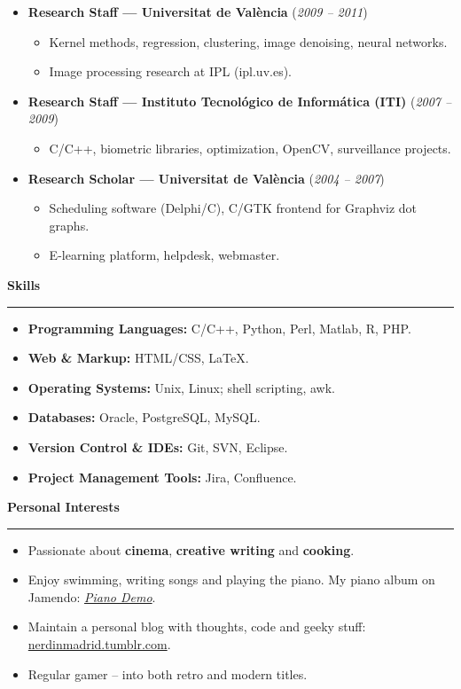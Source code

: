 \documentclass[10pt,a4paper]{article}
\newcommand{\sect}[1]{\vspace{6pt}\noindent\textbf{\large #1}\vspace{2pt}\hrule\vspace{6pt}}
\newcommand{\subsect}[1]{\vspace{4pt}\textbf{#1}}
\begin{document}
\begin{itemize}[leftmargin=*]
\item \subsect{Research Staff — Universitat de València} (\textit{2009 – 2011})
\begin{itemize}[leftmargin=*,label={}]
    \item Kernel methods, regression, clustering, image denoising, neural networks.
    \item Image processing research at IPL (ipl.uv.es).
\end{itemize}

\item \subsect{Research Staff — Instituto Tecnológico de Informática (ITI)} (\textit{2007 – 2009})
\begin{itemize}[leftmargin=*,label={}]
\item C/C++, biometric libraries, optimization, OpenCV, surveillance projects.
\end{itemize}

\item \subsect{Research Scholar — Universitat de València} (\textit{2004 – 2007})
\begin{itemize}[leftmargin=*,label={}]
    \item Scheduling software (Delphi/C), C/GTK frontend for Graphviz dot graphs.
    \item E-learning platform, helpdesk, webmaster.
\end{itemize}

\end{itemize}

\sect{Skills}
\begin{itemize}[leftmargin=*]
    \item \textbf{Programming Languages:} C/C++, Python, Perl, Matlab, R, PHP.
    \item \textbf{Web \& Markup:} HTML/CSS, LaTeX.
    \item \textbf{Operating Systems:} Unix, Linux; shell scripting, awk.
    \item \textbf{Databases:} Oracle, PostgreSQL, MySQL.
    \item \textbf{Version Control \& IDEs:} Git, SVN, Eclipse.
    \item \textbf{Project Management Tools:} Jira, Confluence.
\end{itemize}

\sect{Personal Interests}
\begin{itemize}[leftmargin=*]
    \item Passionate about \textbf{cinema}, \textbf{creative writing} and \textbf{cooking}.
    \item Enjoy swimming, writing songs and playing the piano. My piano album on Jamendo: \href{https://www.jamendo.com/album/51633/piano-demo}{\textit{Piano Demo}}.
    \item Maintain a personal blog with thoughts, code and geeky stuff: \href{https://nerdinmadrid.tumblr.com/}{nerdinmadrid.tumblr.com}.
    \item Regular gamer – into both retro and modern titles.
\end{itemize}
\end{document}
